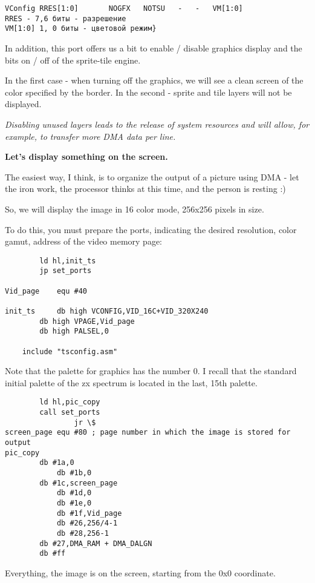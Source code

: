 \documentclass{article}
\begin{document}
\begin{verbatim}
VConfig	RRES[1:0]		NOGFX	NOTSU	-	-	VM[1:0]
RRES - 7,6 биты - разрешение
VM[1:0]	1, 0 биты - цветовой режим}
\end{verbatim}

In addition, this port offers us a bit to enable / disable graphics
display and the bits on / off of the sprite-tile engine.

In the first case - when turning off the graphics, we will see a clean
screen of the color specified by the border. In the second - sprite
and tile layers will not be displayed.

\emph{Disabling unused layers leads to the release of system resources
  and will allow, for example, to transfer more DMA data per line. }

\textbf{Let's display something on the screen. }

The easiest way, I think, is to organize the output of a picture using
DMA - let the iron work, the processor thinks at this time, and the
person is resting :)

So, we will display the image in 16 color mode, 256x256 pixels in
size.

To do this, you must prepare the ports, indicating the desired
resolution, color gamut, address of the video memory page:

\begin{verbatim}
		ld hl,init_ts
		jp set_ports

Vid_page	equ #40

init_ts		db high VCONFIG,VID_16C+VID_320X240
		db high VPAGE,Vid_page
		db high PALSEL,0

	include "tsconfig.asm"
\end{verbatim}

Note that the palette for graphics has the number 0. I recall that the
standard initial palette of the zx spectrum is located in the last,
15th palette.

\begin{verbatim}
		ld hl,pic_copy
		call set_ports
                jr \$
screen_page	equ #80 ; page number in which the image is stored for output
pic_copy
		db #1a,0
	        db #1b,0
		db #1c,screen_page
	        db #1d,0
	        db #1e,0
	        db #1f,Vid_page
	        db #26,256/4-1
	        db #28,256-1
		db #27,DMA_RAM + DMA_DALGN
		db #ff
\end{verbatim}

Everything, the image is on the screen, starting from the 0x0 coordinate. 
\end{document}
